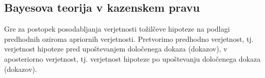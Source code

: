 \documentclass[12pt,a4paper]{amsart}
\theoremstyle{definition} %
\theoremstyle{plain} %
\begin{document}
\subsection{Bayesova teorija v kazenskem pravu}
Gre za postopek posodabljanja verjetnosti tožilčeve hipoteze na podlagi predhodnih oziroma apriornih verjetnosti. Pretvorimo predhodno verjetnost, 
tj. verjetnost hipoteze pred upoštevanjem določenega dokaza (dokazov), v aposteriorno verjetnost, tj. verjetnost hipoteze po upoštevanju določenega 
dokaza (dokazov).\\

\end{document}
